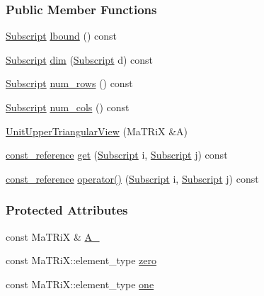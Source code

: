 \subsubsection*{Public Member Functions}
\begin{DoxyCompactItemize}
\item 
\hyperlink{namespace_t_n_t_af22e3f1460e145c04ce4e7d701e4c1c1}{Subscript} \hyperlink{class_t_n_t_1_1_unit_upper_triangular_view_a7bc38e19a83ef703bef26cd07ac8d596}{lbound} () const 
\item 
\hyperlink{namespace_t_n_t_af22e3f1460e145c04ce4e7d701e4c1c1}{Subscript} \hyperlink{class_t_n_t_1_1_unit_upper_triangular_view_a75f9eb15791dc70acefaad6f5c7415fb}{dim} (\hyperlink{namespace_t_n_t_af22e3f1460e145c04ce4e7d701e4c1c1}{Subscript} d) const 
\item 
\hyperlink{namespace_t_n_t_af22e3f1460e145c04ce4e7d701e4c1c1}{Subscript} \hyperlink{class_t_n_t_1_1_unit_upper_triangular_view_a8dc355fdf3b586dd8ca76438a9797cc7}{num\_\-rows} () const 
\item 
\hyperlink{namespace_t_n_t_af22e3f1460e145c04ce4e7d701e4c1c1}{Subscript} \hyperlink{class_t_n_t_1_1_unit_upper_triangular_view_a60cf63a7eb7178ecdd399ee832a2b53a}{num\_\-cols} () const 
\item 
\hyperlink{class_t_n_t_1_1_unit_upper_triangular_view_a3db91ca60114057ff6a22ebbd36f090d}{UnitUpperTriangularView} (MaTRiX \&A)
\item 
\hyperlink{class_t_n_t_1_1_unit_upper_triangular_view_ac1baa9e5d305995a7ce8a10ee57e0fd6}{const\_\-reference} \hyperlink{class_t_n_t_1_1_unit_upper_triangular_view_a8753a01923812d3a849f7898bfc6f92f}{get} (\hyperlink{namespace_t_n_t_af22e3f1460e145c04ce4e7d701e4c1c1}{Subscript} i, \hyperlink{namespace_t_n_t_af22e3f1460e145c04ce4e7d701e4c1c1}{Subscript} j) const 
\item 
\hyperlink{class_t_n_t_1_1_unit_upper_triangular_view_ac1baa9e5d305995a7ce8a10ee57e0fd6}{const\_\-reference} \hyperlink{class_t_n_t_1_1_unit_upper_triangular_view_afeead42b1ccbd0e5716b850d8e64ce98}{operator()} (\hyperlink{namespace_t_n_t_af22e3f1460e145c04ce4e7d701e4c1c1}{Subscript} i, \hyperlink{namespace_t_n_t_af22e3f1460e145c04ce4e7d701e4c1c1}{Subscript} j) const 
\end{DoxyCompactItemize}
\subsubsection*{Protected Attributes}
\begin{DoxyCompactItemize}
\item 
const MaTRiX \& \hyperlink{class_t_n_t_1_1_unit_upper_triangular_view_aaacee6c2eae01c1c0444d35158b32d67}{A\_\-}
\item 
const MaTRiX::element\_\-type \hyperlink{class_t_n_t_1_1_unit_upper_triangular_view_a08687da748789af9a276efddf41d6cf4}{zero}
\item 
const MaTRiX::element\_\-type \hyperlink{class_t_n_t_1_1_unit_upper_triangular_view_a224f21c9cb2c012e3f232b913992a7c1}{one}
\end{DoxyCompactItemize}


